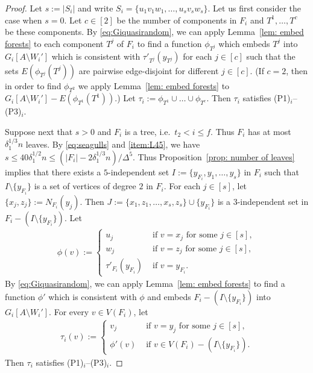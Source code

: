 \documentclass[a4paper, 11pt, reqno]{amsart}
\numberwithin{equation}{section}
\newcommand{\1}{{\rm 1\hspace*{-0.4ex}%
\rule{0.1ex}{1.52ex}\hspace*{0.2ex}}}
\newcommand{\sm}{\setminus}
\begin{document}
\begin{proof}
Let $s:=|S_i|$ and write $S_i = \{u_1v_1w_1, \dots, u_{s}v_{s}w_{s}\}$. 
Let us first consider the case when $s=0$. 
Let $c\in [2]$ be the number of components in $F_i$ and $T^1,\dots,T^c$ be these components.
By \eqref{eq:Giquasirandom}, we can apply Lemma~\ref{lem: embed forests} to each component $T^j$ of $F_i$ to find a function $\phi_{T^j}$ which embeds $T^j$ into $G_i[A\sm W_i']$ 
which is consistent with $\tau'_{T^j}(y_{T^j})$ for each $j\in [c]$ such that the sets $E(\phi_{T^j}(T^j))$ are pairwise edge-disjoint for different $j\in[c]$.
(If $c=2$, then in order to find $\phi_{T^2}$ we apply Lemma~\ref{lem: embed forests} to $G_i[A\sm W_i']-E(\phi_{T^1}(T^1))$.)
Let $\tau_i:= \phi_{T^1}\cup \dots \cup \phi_{T^c}$. 
Then $\tau_i$ satisfies (P1)$_i$--(P3)$_i$.




Suppose next that $s>0$ and $F_i$ is a tree, i.e.~$t_2<i\leq f$.
Thus $F_i$ has at most $\delta_1^{1/3} n$ leaves.
By \eqref{eq:seagulls} and \ref{item:L45}, we have $s\leq 40\delta_1^{1/2} n \leq (|F_i|- 2\delta_1^{1/3}n)/\Delta^{5}$. Thus Proposition~\ref{prop: number of leaves} implies that there exists a $5$-independent set $I:=\{y_{F_i},y_1,\dots, y_{s}\}$ in $F_i$
such that $I\sm \{y_{F_i}\}$ is a set of vertices of degree $2$ in $F_i$.
For each $j\in [s]$, let $\{x_j,z_j\}:=N_{F_i}(y_j)$. 
Then $J:= \{x_1,z_1,\dots,x_{s}, z_{s}\}\cup \{y_{F_i}\}$ is a $3$-independent set in $F_i-(I\sm \{y_{F_i}\})$. 
Let 
\begin{align*}
\phi(v):= \left\{ \begin{array}{ll}
u_j &\text{ if } v=x_j \text{ for some } j\in[s],\\
w_j &\text{ if } v=z_j \text{ for some } j\in[s],\\
\tau'_{F_i}(y_{F_i}) &\text{ if } v= y_{F_i}.
\end{array}\right.
\end{align*}
By \eqref{eq:Giquasirandom}, we can apply Lemma~\ref{lem: embed forests} to find 
a function $\phi'$ which is consistent with $\phi$ and embeds $F_i-(I\sm \{y_{F_i}\})$ into $G_i[A\sm W_i']$.
For every $v\in V(F_i)$,
let
\begin{align*}
\tau_i(v):= \left\{ \begin{array}{ll}
v_j &\text{ if } v=y_j \text{ for some } j\in[s],\\
\phi'(v) &\text{ if } v\in V(F_i)- (I\setminus\{y_{F_i}\}).
\end{array}\right.
\end{align*}
Then $\tau_i$ satisfies (P1)$_{i}$--(P3)$_{i}$.


\end{proof}
\end{document}

